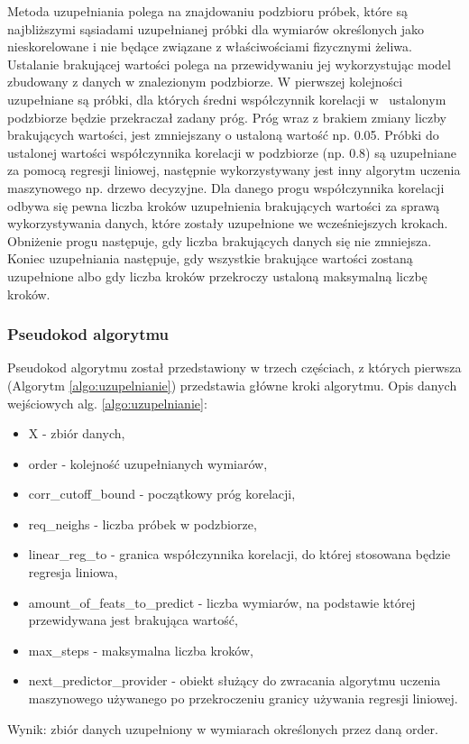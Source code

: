 Metoda uzupełniania polega na znajdowaniu podzbioru próbek, które są najbliższymi sąsiadami uzupełnianej próbki dla wymiarów określonych jako nieskorelowane i nie będące związane z właściwościami fizycznymi żeliwa. Ustalanie brakującej wartości  polega na przewidywaniu jej wykorzystując model zbudowany z danych w znalezionym podzbiorze. W pierwszej kolejności uzupełniane są próbki, dla których średni współczynnik korelacji w~ ustalonym podzbiorze będzie przekraczał zadany próg. Próg wraz z brakiem zmiany liczby brakujących wartości, jest zmniejszany o ustaloną wartość np. 0.05. Próbki do ustalonej wartości współczynnika korelacji  w podzbiorze (np. 0.8) są uzupełniane za pomocą regresji liniowej, następnie wykorzystywany jest inny algorytm uczenia maszynowego np. drzewo decyzyjne. Dla danego progu współczynnika korelacji odbywa się pewna liczba kroków uzupełnienia brakujących wartości za sprawą wykorzystywania danych, które zostały uzupełnione we wcześniejszych krokach. Obniżenie progu następuje, gdy liczba brakujących danych się nie zmniejsza. Koniec uzupełniania następuje, gdy wszystkie brakujące wartości zostaną uzupełnione albo gdy liczba kroków przekroczy ustaloną maksymalną liczbę kroków.

\subsubsection{Pseudokod algorytmu}\label{sec:filling-pseudocode}
Pseudokod algorytmu został przedstawiony w trzech częściach, z których pierwsza (Algorytm \ref{algo:uzupelnianie}) przedstawia główne kroki algorytmu. 
Opis danych wejściowych alg. \ref{algo:uzupelnianie}:
\begin{itemize}
\item X - zbiór danych,
\item order - kolejność uzupełnianych wymiarów,
\item corr\_cutoff\_bound - początkowy próg korelacji,
\item req\_neighs - liczba próbek w podzbiorze, 
\item linear\_reg\_to - granica współczynnika korelacji, do której stosowana będzie regresja liniowa,
\item amount\_of\_feats\_to\_predict - liczba wymiarów, na podstawie której przewidywana jest brakująca wartość,
\item max\_steps - maksymalna liczba kroków,
\item next\_predictor\_provider - obiekt służący do zwracania algorytmu uczenia maszynowego używanego po przekroczeniu granicy używania regresji liniowej.
\end{itemize}
Wynik: zbiór danych uzupełniony w wymiarach określonych przez daną order.


